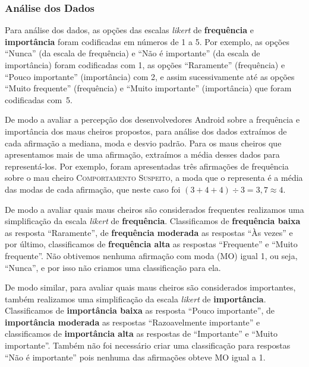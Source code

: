 \subsubsection{Análise dos Dados}
\label{etapa-2-analise}

Para análise dos dados, as opções das escalas \textit{likert} de \textbf{\small frequência} e \textbf{\small importância} foram codificadas em números de 1 a 5. Por exemplo, as opções ``Nunca'' (da escala de frequência) e ``Não é importante'' (da escala de importância) foram codificadas com 1, as opções ``Raramente'' (frequência) e ``Pouco importante'' (importância) com 2, e assim sucessivamente até as opções ``Muito frequente'' (frequência) e ``Muito importante'' (importância) que foram codificadas com~5.

De modo a avaliar a percepção dos desenvolvedores Android sobre a frequência e importância dos maus cheiros propostos, para análise dos dados extraímos de cada afirmação a mediana, moda e desvio padrão. Para os maus cheiros que apresentamos mais de uma afirmação, extraímos a média desses dados para representá-los. Por exemplo, foram apresentadas três afirmações de frequência sobre o mau cheiro \textsc{\small Comportamento Suspeito}, a moda que o representa é a média das modas de cada afirmação, que neste caso foi $(3 + 4 + 4) \div 3 = 3,7 \approx 4$.

De modo a avaliar quais maus cheiros são considerados frequentes realizamos uma simplificação da escala \textit{likert} de \textbf{\small frequência}. Classificamos de \textbf{\small frequência baixa} as resposta ``Raramente'', de \textbf{\small frequência moderada} as respostas ``Às vezes'' e por último, classificamos de \textbf{\small frequência alta} as respostas ``Frequente'' e ``Muito frequente''. Não obtivemos nenhuma afirmação com moda (MO) igual 1, ou seja, ``Nunca'', e por isso não criamos uma classificação para ela.

De modo similar, para avaliar quais maus cheiros são considerados importantes, também realizamos uma simplificação da escala \textit{likert} de \textbf{\small importância}. Classificamos de \textbf{\small importância baixa} as resposta ``Pouco importante'', de \textbf{\small importância moderada} as respostas ``Razoavelmente importante'' e classificamos de \textbf{\small importância alta} as respostas de ``Importante'' e ``Muito importante''. Também não foi necessário criar uma classificação para respostas ``Não é importante'' pois nenhuma das afirmações obteve MO igual a 1.















